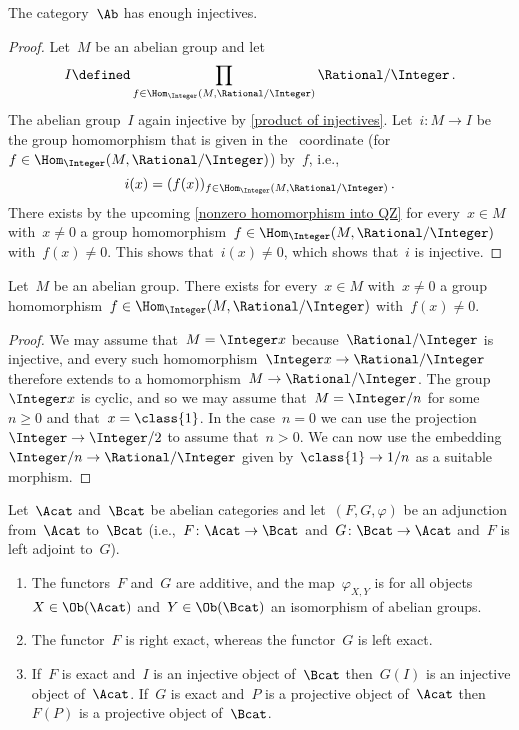 \begin{corollary}
  \label{Ab has enough injectives}
  The category~$\Ab$ has enough injectives.
\end{corollary}


\begin{proof}
  Let~$M$ be an abelian group and let
  \[
    I
    \defined
    \prod_{f \in \Hom_\Integer(M, \Rational/\Integer)} \Rational/\Integer \,.
  \]
  The abelian group~$I$ again injective by \cref{product of injectives}.
  Let~$i \colon M \to I$ be the group homomorphism that is given in the~ coordinate (for~$f \in \Hom_\Integer(M, \Rational/\Integer)$) by~$f$, i.e.,
  \[
    i(x)
    =
    ( f(x) )_{f \in \Hom_\Integer(M, \Rational/\Integer)} \,.
  \]
  There exists by the upcoming \cref{nonzero homomorphism into QZ} for every~$x \in M$ with~$x \neq 0$ a group homomorphism~$f \in \Hom_\Integer(M, \Rational/\Integer)$ with~$f(x) \neq 0$.
  This shows that~$i(x) \neq 0$, which shows that~$i$ is injective.
\end{proof}


\begin{lemma}
  \label{nonzero homomorphism into QZ}
  Let~$M$ be an abelian group.
  There exists for every~$x \in M$ with~$x \neq 0$ a group homomorphism~$f \in \Hom_\Integer(M, \Rational/\Integer)$ with~$f(x) \neq 0$.
\end{lemma}


\begin{proof}
  We may assume that~$M = \Integer x$ because~$\Rational/\Integer$ is injective, and every such homomorphism~$\Integer x \to \Rational/\Integer$ therefore extends to a homomorphism~$M \to \Rational/\Integer$.
  The group~$\Integer x$ is cyclic, and so we may assume that~$M = \Integer/n$ for some~$n \geq 0$ and that~$x = \class{1}$.
  In the case~$n = 0$ we can use the projection~$\Integer \to \Integer/2$  to assume that~$n > 0$.
  We can now use the embedding~$\Integer/n \to \Rational/\Integer$ given by~$\class{1} \to 1/n$ as a suitable morphism.
\end{proof}


\begin{theorem}
  \label{adjunctions between abelian categories}
  Let~$\Acat$ and~$\Bcat$ be abelian categories and let~$(F, G, \varphi)$ be an adjunction from~$\Acat$ to~$\Bcat$
  (i.e.,~$F \colon \Acat \to \Bcat$ and~$G \colon \Bcat \to \Acat$ and~$F$ is left adjoint to~$G$).
  \begin{enumerate}
    \item
      The functors~$F$ and~$G$ are additive, and the map~$\varphi_{X,Y}$ is for all objects~$X \in \Ob(\Acat)$ and~$Y \in \Ob(\Bcat)$ an isomorphism of abelian groups.
    \item
      The functor~$F$ is right exact, whereas the functor~$G$ is left exact.
    \item
      \label{exact preserve inj and proj}
      If~$F$ is exact and~$I$ is an injective object of~$\Bcat$ then~$G(I)$ is an injective object of~$\Acat$.
      If~$G$ is exact and~$P$ is a projective object of~$\Acat$ then~$F(P)$ is a projective object of~$\Bcat$.
  \end{enumerate}
\end{theorem}


